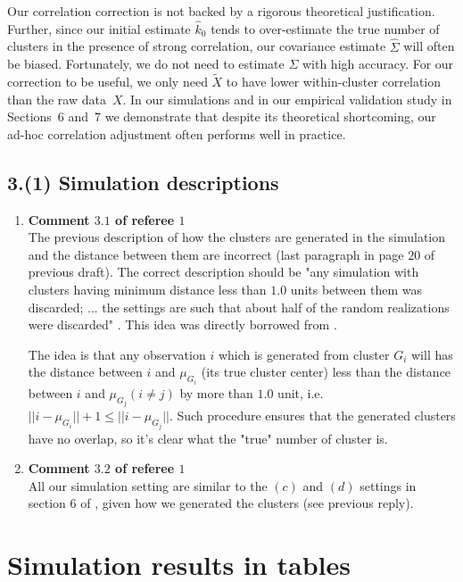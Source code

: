 \documentclass[11pt]{article}
\begin{document}
Our correlation correction is not backed by a rigorous theoretical
justification. Further, since our initial estimate $\hat k_0$ tends to
over-estimate the true number of clusters in the presence of strong
correlation, our covariance estimate $\hat \Sigma$ will often be biased.
Fortunately, we do not need to estimate $\Sigma$ with high accuracy. For our
correction to be useful, we only need $\tilde{X}$ to have lower within-cluster
correlation than the raw data~$X$. In our simulations and in our empirical
validation study in Sections~6 and~7 we demonstrate that despite its
theoretical shortcoming, our ad-hoc correlation adjustment often performs well
in practice.


\subsection{3.(1) Simulation descriptions}

\begin{enumerate}

	\item \textbf{Comment $3.1$ of referee $1$} \\
    The previous description of how the clusters are generated in the simulation and the distance between them are incorrect (last paragraph in page $20$ of previous draft). The correct description should be "any simulation with clusters having minimum distance less than $1.0$ units between them was discarded; ... the settings are such that about half of the random realizations were discarded"
\cite{tibshirani2001estimating}. This idea was directly borrowed from \cite{tibshirani2001estimating}. 

The idea is that any observation $i$ which is generated from cluster $G_i$ will has the distance between $i$ and $\mu_{G_i}$ (its true cluster center) less than the distance between $i$ and $\mu_{G_j} (i\neq j)$ by more than $1.0$ unit, i.e. $||i - \mu_{G_i}|| + 1 \leq ||i - \mu_{G_j}||$. Such procedure ensures that the generated clusters have no overlap, so it's clear what the "true" number of cluster is. 
	\item \textbf{Comment $3.2$ of referee $1$} \\
	All our simulation setting are similar to the $(c)$ and $(d)$ settings in section $6$ of \cite{tibshirani2001estimating}, given how we generated the clusters (see previous reply). 
\end{enumerate}

\section{Simulation results in tables}
\end{document}
